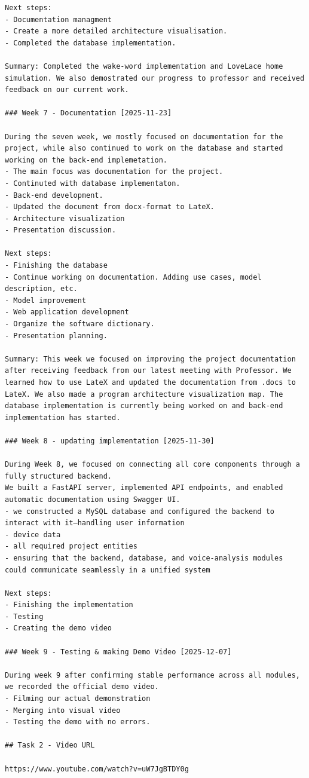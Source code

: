\documentclass[conference]{IEEEtran}
\begin{document}
\begin{lstlisting}
Next steps:
- Documentation managment
- Create a more detailed architecture visualisation.
- Completed the database implementation.

Summary: Completed the wake-word implementation and LoveLace home simulation. We also demostrated our progress to professor and received feedback on our current work.

### Week 7 - Documentation [2025-11-23]

During the seven week, we mostly focused on documentation for the project, while also continued to work on the database and started working on the back-end implemetation.
- The main focus was documentation for the project.
- Continuted with database implementaton.
- Back-end development.
- Updated the document from docx-format to LateX.
- Architecture visualization
- Presentation discussion.

Next steps:
- Finishing the database
- Continue working on documentation. Adding use cases, model description, etc.
- Model improvement
- Web application development
- Organize the software dictionary.
- Presentation planning.

Summary: This week we focused on improving the project documentation after receiving feedback from our latest meeting with Professor. We learned how to use LateX and updated the documentation from .docs to LateX. We also made a program architecture visualization map. The database implementation is currently being worked on and back-end implementation has started.

### Week 8 - updating implementation [2025-11-30]

During Week 8, we focused on connecting all core components through a fully structured backend.
We built a FastAPI server, implemented API endpoints, and enabled automatic documentation using Swagger UI.
- we constructed a MySQL database and configured the backend to interact with it—handling user information
- device data
- all required project entities
- ensuring that the backend, database, and voice-analysis modules could communicate seamlessly in a unified system

Next steps:
- Finishing the implementation
- Testing
- Creating the demo video

### Week 9 - Testing & making Demo Video [2025-12-07]

During week 9 after confirming stable performance across all modules, we recorded the official demo video.
- Filming our actual demonstration
- Merging into visual video
- Testing the demo with no errors.

## Task 2 - Video URL

https://www.youtube.com/watch?v=uW7JgBTDY0g

\end{lstlisting}
\end{document}
